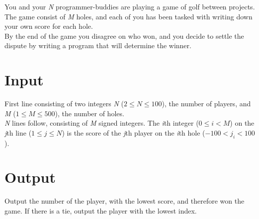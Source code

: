 

\noindent You and your \textit{N} programmer-buddies are playing a game of golf between projects. The game consist of \textit{M} holes, and each of you has been tasked with writing down your own score for each hole.
\\By the end of the game you disagree on who won, and you decide to settle the dispute by writing a program that will determine the winner.

\section*{Input}
First line consisting of two integers \textit{N} ($2 \leq N \leq 100$), the number of players, and \textit{M} ($1 \leq M \leq 500$), the number of holes.
\\\textit{N} lines follow, consisting of \textit{M} signed integers. The \textit{i}th integer ($0 \leq i < M$) on the \textit{j}th line ($1 \leq j \leq N$) is the score of the \textit{j}th player on the \textit{i}th hole ($ -100 < j_{i} < 100$).

\section*{Output}
Output the number of the player, with the lowest score, and therefore won the game. If there is a tie, output the player with the lowest index.